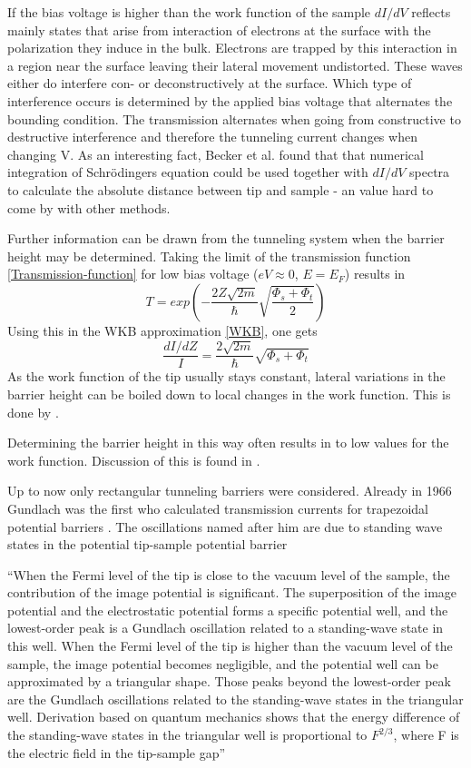 If the bias voltage is higher than the work function of the sample $dI/dV$ reflects mainly states that arise from interaction of electrons at the surface with the polarization they induce in the bulk. Electrons are trapped by this interaction in a region near the surface leaving their lateral movement undistorted. These waves either do interfere con- or deconstructively at the surface. Which type of interference occurs is determined by the applied bias voltage that alternates the bounding condition. The transmission alternates when going from constructive to destructive interference and therefore the tunneling current changes when changing V. 
As an interesting fact, Becker et al.\cite{becker_electron_1985} found that that numerical integration of Schr\"odingers equation could be used together with $dI/dV$ spectra to calculate the absolute distance between tip and sample - an value hard to come by with other methods.

Further information can be drawn from the tunneling system when the barrier height may be determined.
Taking the limit of the transmission function \eqref{Transmission-function} for low bias voltage ($eV\approx0$, $E=E_F$) results in 
$$T=exp\left(-\frac{2Z\sqrt{2m}}{\hbar}\sqrt{\frac{\Phi_s+\Phi_t}{2}}\right)$$
Using this in the WKB approximation \eqref{WKB}, one gets $$\frac{dI/dZ}{I}=\frac{2\sqrt{2m}}{\hbar}\sqrt{\Phi_s+\Phi_t}$$
As the work function of the tip usually stays constant, lateral variations in the barrier height can be boiled down to local changes in the work function. This is done by \cite{jia_variation_1998}.

Determining the barrier height in this way often results in to low values for the work function. Discussion of this is found in \cite[96]{bonnell_scanning_1993}.

Up to now only rectangular tunneling barriers were considered.
Already in 1966 Gundlach was the first who calculated transmission currents for trapezoidal potential barriers \cite{gundlach_zur_1966}. The oscillations named after him are due to standing wave states in the potential tip-sample potential barrier \cite{binnig_tunneling_1985,becker_electron_1985}

``When the Fermi level of the tip is close to the vacuum level of  the  sample,  the  contribution  of  the  image  potential  is significant. The superposition of the  image  potential  and the electrostatic  potential forms a specific potential well, and the lowest-order peak is a Gundlach oscillation related to a standing-wave state in this well. When the Fermi level of the tip is higher than the vacuum level of the sample, the image potential becomes negligible, and the potential well can be  approximated  by a triangular  shape. Those peaks beyond the lowest-order peak are the Gundlach oscillations related to the standing-wave states in the triangular well. Derivation  based  on  quantum  mechanics  shows  that  the energy difference of the standing-wave states in the triangular  well  is  proportional  to $F^{2/3}$,  where F is  the electric field in the tip-sample gap''\cite{lin_manifestation_2007}

